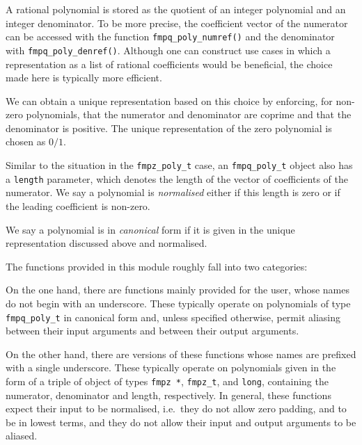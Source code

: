 \documentclass[a4paper,10pt]{book}
\newcommand{\code}{\lstinline}
\begin{document}
A rational polynomial is stored as the quotient of an integer polynomial 
and an integer denominator.  To be more precise, the coefficient vector 
of the numerator can be accessed with the function \code{fmpq_poly_numref()} 
and the denominator with \code{fmpq_poly_denref()}.  Although one can 
construct use cases in which a representation as a list of rational 
coefficients would be beneficial, the choice made here is typically 
more efficient.

We can obtain a unique representation based on this choice by enforcing, 
for non-zero polynomials, that the numerator and denominator are coprime 
and that the denominator is positive.  The unique representation of the 
zero polynomial is chosen as $0/1$.

Similar to the situation in the \code{fmpz_poly_t} case, an 
\code{fmpq_poly_t} object also has a \code{length} parameter, which 
denotes the length of the vector of coefficients of the numerator. 
We say a polynomial is \emph{normalised} either if this length is zero 
or if the leading coefficient is non-zero.

We say a polynomial is in \emph{canonical} form if it is given in the 
unique representation discussed above and normalised.

The functions provided in this module roughly fall into two categories:

On the one hand, there are functions mainly provided for the user, whose 
names do not begin with an underscore.  These typically operate on 
polynomials of type \code{fmpq_poly_t} in canonical form and, unless 
specified otherwise, permit aliasing between their input arguments and 
between their output arguments.

On the other hand, there are versions of these functions whose names are 
prefixed with a single underscore.  These typically operate on polynomials 
given in the form of a triple of object of types \code{fmpz *}, 
\code{fmpz_t}, and \code{long}, containing the numerator, denominator and 
length, respectively.  In general, these functions expect their input to 
be normalised, i.e.\ they do not allow zero padding, and to be in lowest 
terms, and they do not allow their input and output arguments to be aliased.



\end{document}

